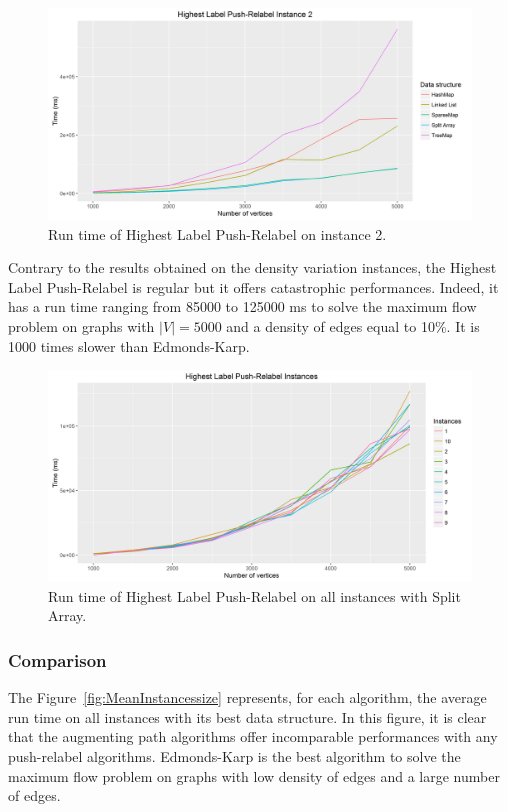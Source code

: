 \begin{figure}[H]
\includegraphics[scale=0.5]{images/HLPR2.png}
\caption{Run time of Highest Label Push-Relabel on instance 2.}
\label{fig:HLPR2}
\end{figure}

Contrary to the results obtained on the density variation instances, the Highest Label Push-Relabel is regular but it offers catastrophic performances. Indeed, it has a run time ranging from 85000 to 125000 ms to solve the maximum flow problem on graphs with $|V|=5000$ and a density of edges equal to 10\%. It is 1000 times slower than Edmonds-Karp.

\begin{figure}[H]
\includegraphics[scale=0.5]{images/HLPRmean.png}
\caption{Run time of Highest Label Push-Relabel on all instances with Split Array.}
\label{fig:HLPRmean}
\end{figure}

\subsubsection{Comparison}
The Figure~\ref{fig:MeanInstancessize} represents, for each algorithm, the average run time on all instances with its best data structure. In this figure, it is clear that the augmenting path algorithms offer incomparable performances with any push-relabel algorithms. Edmonds-Karp is the best algorithm to solve the maximum flow problem on graphs with low density of edges and a large number of edges.

